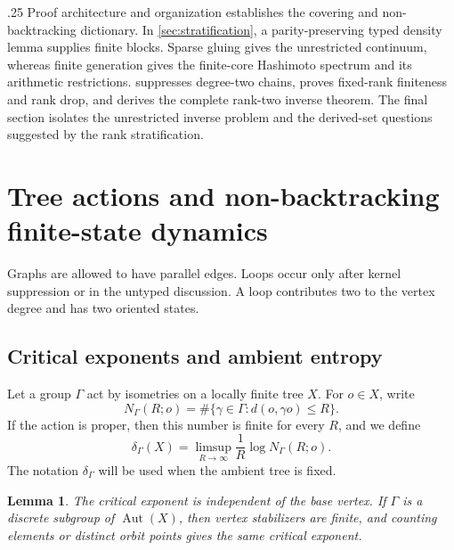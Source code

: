 \documentclass[11pt]{amsart}
\makeatletter
\def\paragraph{\@startsection{paragraph}{4}%
  \z@{.65\linespacing\@plus.45\linespacing}%
  {.25\linespacing}%
  {\normalfont\bfseries}}
\theoremstyle{plain}
\newtheorem{lemma}[theorem]{Lemma}
\theoremstyle{definition}
\theoremstyle{remark}
\newcommand{\Aut}{\operatorname{Aut}}
\makeatother
\begin{document}
\paragraph{Proof architecture and organization}
 establishes the covering and non-backtracking
dictionary.  In \cref{sec:stratification}, a parity-preserving typed density
lemma supplies finite blocks.  Sparse gluing gives the unrestricted
continuum, whereas finite generation gives the finite-core Hashimoto
spectrum and its arithmetic restrictions.   suppresses
degree-two chains, proves fixed-rank finiteness and rank drop, and derives
the complete rank-two inverse theorem.  The final section isolates the
unrestricted inverse problem and the derived-set questions suggested by
the rank stratification.

\section{Tree actions and non-backtracking finite-state dynamics}
\label{sec:dictionary}


Graphs are allowed to have parallel edges.  Loops occur only after kernel
suppression or in the untyped discussion.  A loop contributes two to the
vertex degree and has two oriented states.


\subsection{Critical exponents and ambient entropy}


Let a group \(\Gamma\) act by isometries on a locally finite tree \(X\).
For \(o\in X\), write
\[
  N_\Gamma(R;o)
  =\#\{\gamma\in\Gamma:d(o,\gamma o)\leq R\}.
\]
If the action is proper, then this number is finite for every \(R\), and we
define
\[
  \delta_\Gamma(X)
  =\limsup_{R\to\infty}\frac1R\log N_\Gamma(R;o).
\]
The notation \(\delta_\Gamma\) will be used when the ambient tree is fixed.

\begin{lemma}\label{lem:basepoint}
The critical exponent is independent of the base vertex.  If \(\Gamma\) is
a discrete subgroup of \(\Aut(X)\), then vertex stabilizers are finite, and
counting elements or distinct orbit points gives the same critical exponent.
\end{lemma}
\end{document}

